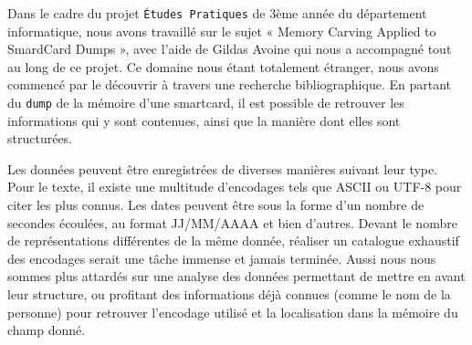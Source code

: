 Dans le cadre du projet \texttt{Études Pratiques} de 3ème année du département informatique, nous avons travaillé sur le sujet « Memory Carving Applied to SmardCard Dumps », avec l'aide de Gildas Avoine qui nous a accompagné tout au long de ce projet. Ce domaine nous étant totalement étranger, nous avons commencé par le découvrir à travers une recherche bibliographique. En partant du \texttt{dump} de la mémoire d'une smartcard, il est possible de retrouver les informations qui y sont contenues, ainsi que la manière dont elles sont structurées.

Les données peuvent être enregistrées de diverses manières suivant leur type. Pour le texte, il existe une multitude d'encodages tels que ASCII \cite{ASCII} \cite{ECMA6} ou UTF-8 \cite{UTF8} pour citer les plus connus. Les dates peuvent être sous la forme d'un nombre de secondes écoulées, au format JJ/MM/AAAA et bien d'autres. Devant le nombre de représentations différentes de la même donnée, réaliser un catalogue exhaustif des encodages serait une tâche immense et jamais terminée. Aussi nous nous sommes plus attardés sur une analyse des données permettant de mettre en avant leur structure, ou profitant des informations déjà connues (comme le nom de la personne) pour retrouver l'encodage utilisé et la localisation dans la mémoire du champ donné.
